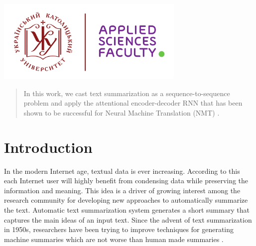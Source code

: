 \begin{titlepage}

\includegraphics[height=4cm]{img/UCU-Apps.png}\\[1cm] %
 

\vfill %

\end{titlepage}


\begin{abstract}
In this work, we cast text summarization as a sequence-to-sequence problem and apply the attentional encoder-decoder RNN that has been shown to be successful for Neural Machine Translation (NMT) \cite{baseline_NMT}.
\end{abstract}

\section{Introduction}

In the modern Internet age, textual data is ever increasing. According to this each Internet user will highly benefit from condensing data while preserving the information and meaning. This idea is a driver of growing interest among the research community for developing new approaches to automatically summarize the text. Automatic text summarization system generates a short summary that captures the main ideas
of an input text. Since the advent of text summarization in 1950s, researchers have been trying to improve techniques for generating machine summaries which are not worse than human made summaries \cite{text_sum_survey}.
  
